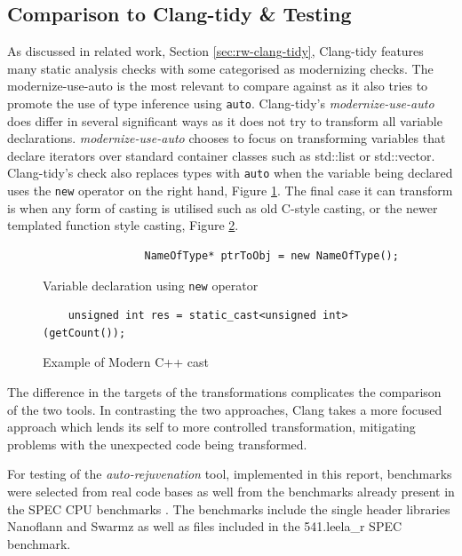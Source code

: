 \documentclass[bsc,frontabs,singlespacing,twoside,parskip,deptreport]{infthesis}
\begin{document}
\subsection{Comparison to Clang-tidy \& Testing }\label{sec:cmp-auto-reju-mod-auto}


As discussed in related work, Section \ref{sec:rw-clang-tidy}, Clang-tidy features many static analysis checks with some categorised as modernizing checks. The modernize-use-auto \cite{CLANG_AUTO} is the most relevant to compare against as it also tries to promote the use of type inference using \texttt{auto}. Clang-tidy's \textit{modernize-use-auto} does differ in several significant ways as it does not try to transform all variable declarations. \textit{modernize-use-auto} chooses to focus on transforming variables that declare iterators over standard container classes such as std::list or std::vector. Clang-tidy's check also replaces types with \texttt{auto} when the variable being declared uses the \texttt{new} operator on the right hand, Figure \ref{fig:code-new-vardec}. The final case it can transform is when any form of casting is utilised such as old C-style casting, or the newer templated function style casting, Figure \ref{fig:code-modern-cast}.

\begin{figure}[H]
    \begin{verbatim}
                NameOfType* ptrToObj = new NameOfType(); 
    \end{verbatim}
    \caption{Variable declaration using \texttt{new} operator}
    \centering
    \label{fig:code-new-vardec}
\end{figure}

\begin{figure}[H]
    \begin{verbatim}
    unsigned int res = static_cast<unsigned int>(getCount());
    \end{verbatim}
    \caption{Example of Modern C++ cast}
    \centering
    \label{fig:code-modern-cast}
\end{figure}

The difference in the targets of the transformations complicates the comparison of the two tools. In contrasting the two approaches, Clang takes a more focused approach which lends its self to more controlled transformation, mitigating problems with the unexpected code being transformed.

For testing of the \textit{auto-rejuvenation} tool, implemented in this report, benchmarks were selected from real code bases as well from the benchmarks already present in the SPEC CPU benchmarks \cite{SPEC}. The benchmarks include the single header libraries Nanoflann \cite{blanco2014nanoflann} and Swarmz \cite{SWARMZ} as well as files included in the 541.leela\_r \cite{SPEC_LEELA} SPEC benchmark.
\end{document}
